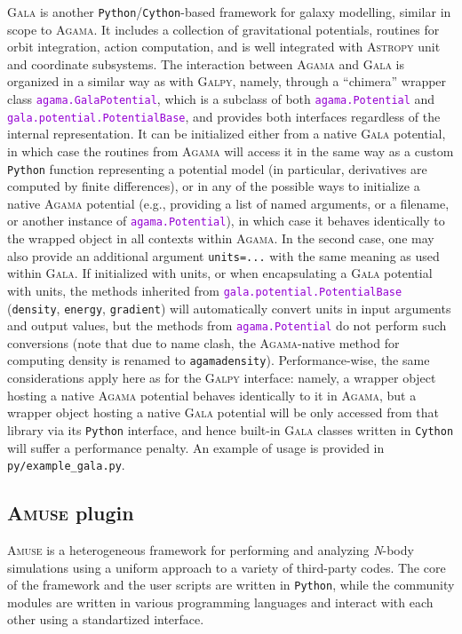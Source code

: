 \documentclass[12pt]{article}
\newcommand{\Agama}{\textsc{Agama}\xspace}
\newcommand{\Amuse}{\textsc{Amuse}\xspace}
\newcommand{\Galpy}{\textsc{Galpy}\xspace}
\newcommand{\Gala} {\textsc{Gala}\xspace}
\newcommand{\Nbody}{\textsl{N}-body\xspace}
\newcommand{\Python}{\texttt{Python}\xspace}
\newcommand{\ttt}[1]{\textcolor{darkviolet}{\texttt{#1}}}
\begin{document}
\Gala \cite{Gala} is another \Python/\texttt{Cython}-based framework for galaxy modelling, similar in scope to \Agama. It includes a collection of gravitational potentials, routines for orbit integration, action computation, and is well integrated with \textsc{Astropy} unit and coordinate subsystems.
The interaction between \Agama and \Gala is organized in a similar way as with \Galpy, namely, through a ``chimera'' wrapper class \ttt{agama.GalaPotential}, which is a subclass of both \ttt{agama.Potential} and \ttt{gala.potential.PotentialBase}, and provides both interfaces regardless of the internal representation. It can be initialized either from a native \Gala potential, in which case the routines from \Agama will access it in the same way as a custom \Python function representing a potential model (in particular, derivatives are computed by finite differences), or in any of the possible ways to initialize a native \Agama potential (e.g., providing a list of named arguments, or a filename, or another instance of \ttt{agama.Potential}), in which case it behaves identically to the wrapped object in all contexts within \Agama. In the second case, one may also provide an additional argument \texttt{units=...} with the same meaning as used within \Gala. If initialized with units, or when encapsulating a \Gala potential with units, the methods inherited from \ttt{gala.potential.PotentialBase} (\texttt{density}, \texttt{energy}, \texttt{gradient}) will automatically convert units in input arguments and output values, but the methods from \ttt{agama.Potential} do not perform such conversions (note that due to name clash, the \Agama-native method for computing density is renamed to \texttt{agamadensity}). Performance-wise, the same considerations apply here as for the \Galpy interface: namely, a wrapper object hosting a  native \Agama potential behaves identically to it in \Agama, but a wrapper object hosting a native \Gala potential will be only accessed from that library via its \Python interface, and hence built-in \Gala classes written in \texttt{Cython} will suffer a performance penalty. An example of usage is provided in \texttt{py/example_gala.py}.


\subsection{\Amuse plugin}  \label{sec:Amuse}

\Amuse \cite{PortegiesZwart2013} is a heterogeneous framework for performing and analyzing \Nbody simulations using a uniform approach to a variety of third-party codes. The core of the framework and the user scripts are written in \Python, while the community modules are written in various programming languages and interact with each other using a standartized interface.
\end{document}
